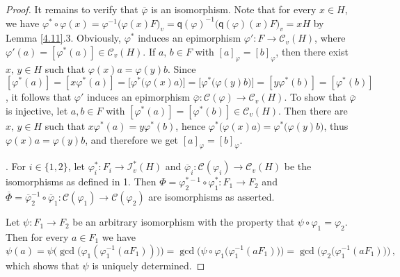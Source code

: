 \documentclass[a4paper]{amsart}
\theoremstyle{definition}
\numberwithin{equation}{section}
\begin{document}
\begin{proof}
\smallskip
It remains to verify that $\overline \varphi$ is an isomorphism.
Note that for every $x \in H$, we have $\varphi ^* \circ \varphi(x)
= \varphi^{-1}\bigl( \varphi (x)F \bigr)_v = \mathsf q(\varphi)^{-1}
\bigl( \mathsf q (\varphi)(x) F \bigr)_v = xH$ by Lemma
\ref{4.11}.3. Obviously, $\varphi^*$ induces an epimorphism
$\varphi' \colon F \to \mathcal C_v (H)$, where $\varphi' (a) =
[\varphi^* (a)] \in \mathcal C_v (H)$. If $a,\, b \in F$ with
$[a]_\varphi = [b]_\varphi$, then there exist $x, \,y \in H$ such
that $\varphi(x)a = \varphi(y)b$. Since $[\varphi^*(a)] = [x
\varphi^*(a)] = \bigl[\varphi^* \bigl( \varphi(x)a \bigr)\bigr] =
\bigl[\varphi^* \bigl( \varphi(y)b \bigr)\bigr]= [y \varphi^*(b)]
=[\varphi^*(b)]$, it follows that $\varphi'$ induces an epimorphism
$\overline \varphi \colon \mathcal C (\varphi) \to \mathcal C_v
(H)$. To show that $\overline \varphi$ is injective, let $a, b \in
F$ with $[ \varphi^*(a) ] = [ \varphi^*(b)] \in \mathcal C_v(H)$.
Then there are $x,\, y \in H$ such that $x \varphi^*(a) = y
\varphi^*(b)$, hence $\varphi^*\bigl( \varphi(x)a \bigr) =
\varphi^*\bigl( \varphi(y)b \bigr)$,  thus $\varphi(x)a = \varphi(y)
b$, and therefore we get $[a]_\varphi = [b]_\varphi$.

. For $i \in \{1,2\}$, let  $\varphi_i^* \colon F_i \to \mathcal
I_v^*(H)$ and $\overline \varphi_i \colon \mathcal C (\varphi_i) \to
\mathcal C_v(H)$ be the isomorphisms as defined in 1. Then $\Phi =
\varphi_2^{*-1} \circ \varphi_1^* \colon F_1 \to F_2$ and $\overline
\Phi = \overline \varphi_2^{-1} \circ \overline \varphi_1 \colon
\mathcal C(\varphi_1) \to \mathcal C(\varphi_2)$ are isomorphisms as
asserted.

Let $\psi \colon F_1 \to F_2$ be an arbitrary  isomorphism with the
property that $\psi \circ \varphi_1 = \varphi_2$. Then for every $a
\in F_1$ we have
\[
\psi(a) = \psi \bigl( \gcd \bigl( \varphi_1( \varphi_1^{-1}(aF_1))
\bigr) \bigr) = \gcd \bigl( \psi \circ \varphi_1 \bigl(
\varphi_1^{-1}(aF_1) \bigr) \bigr) = \gcd \bigl( \varphi_2 \bigl(
\varphi_1^{-1}(aF_1) \bigr) \bigr) \,,
\]
which shows that $\psi$ is uniquely determined.
\end{proof}
\end{document}

